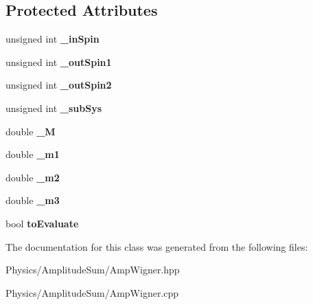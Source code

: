 \subsection*{Protected Attributes}
\begin{DoxyCompactItemize}
\item 
\hypertarget{class_amp_wigner_ad9e35a3e41b2dc47c605cfda5e2785f6}{unsigned int {\bfseries \-\_\-in\-Spin}}\label{class_amp_wigner_ad9e35a3e41b2dc47c605cfda5e2785f6}

\item 
\hypertarget{class_amp_wigner_a6d0d70fbb59c071ac5ce1fef35eda1bc}{unsigned int {\bfseries \-\_\-out\-Spin1}}\label{class_amp_wigner_a6d0d70fbb59c071ac5ce1fef35eda1bc}

\item 
\hypertarget{class_amp_wigner_a9742040a6ce6a486b69d3590120050b1}{unsigned int {\bfseries \-\_\-out\-Spin2}}\label{class_amp_wigner_a9742040a6ce6a486b69d3590120050b1}

\item 
\hypertarget{class_amp_wigner_a863cebcb9a5ce10f5c2633f5307f1ed7}{unsigned int {\bfseries \-\_\-sub\-Sys}}\label{class_amp_wigner_a863cebcb9a5ce10f5c2633f5307f1ed7}

\item 
\hypertarget{class_amp_wigner_a32e856e58b4f803be41b29fd02a83a4d}{double {\bfseries \-\_\-\-M}}\label{class_amp_wigner_a32e856e58b4f803be41b29fd02a83a4d}

\item 
\hypertarget{class_amp_wigner_aa16c14c601d903f986408382c4f85a46}{double {\bfseries \-\_\-m1}}\label{class_amp_wigner_aa16c14c601d903f986408382c4f85a46}

\item 
\hypertarget{class_amp_wigner_a5216b522b1c493db5b1c56112945ff8f}{double {\bfseries \-\_\-m2}}\label{class_amp_wigner_a5216b522b1c493db5b1c56112945ff8f}

\item 
\hypertarget{class_amp_wigner_a9079195d22ad26b22bd309bdc3af7581}{double {\bfseries \-\_\-m3}}\label{class_amp_wigner_a9079195d22ad26b22bd309bdc3af7581}

\item 
\hypertarget{class_amp_wigner_adc9a253f9efd45d6781793f89154bc08}{bool {\bfseries to\-Evaluate}}\label{class_amp_wigner_adc9a253f9efd45d6781793f89154bc08}

\end{DoxyCompactItemize}


The documentation for this class was generated from the following files\-:\begin{DoxyCompactItemize}
\item 
Physics/\-Amplitude\-Sum/Amp\-Wigner.\-hpp\item 
Physics/\-Amplitude\-Sum/Amp\-Wigner.\-cpp\end{DoxyCompactItemize}
